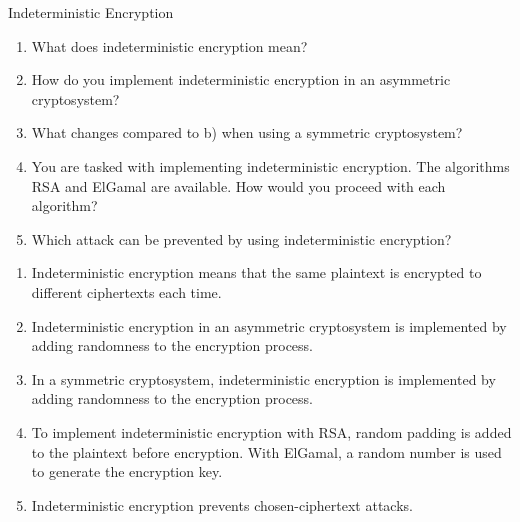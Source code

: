 \documentclass{article}
\begin{document}
\begin{exercise}{Indeterministic Encryption}
  \begin{enumerate}
    \item What does indeterministic encryption mean?
    \item How do you implement indeterministic encryption in an asymmetric cryptosystem?
    \item What changes compared to b) when using a symmetric cryptosystem?
    \item You are tasked with implementing indeterministic encryption. The algorithms RSA and ElGamal are available. How would you proceed with each algorithm?
    \item Which attack can be prevented by using indeterministic encryption?
  \end{enumerate}

  \begin{solution}
    \begin{enumerate}
      \item Indeterministic encryption means that the same plaintext is encrypted to different ciphertexts each time.
      \item Indeterministic encryption in an asymmetric cryptosystem is implemented by adding randomness to the encryption process.
      \item In a symmetric cryptosystem, indeterministic encryption is implemented by adding randomness to the encryption process.
      \item To implement indeterministic encryption with RSA, random padding is added to the plaintext before encryption. With ElGamal, a random number is used to generate the encryption key.
      \item Indeterministic encryption prevents chosen-ciphertext attacks.
    \end{enumerate}
  \end{solution}
\end{exercise}
\end{document}
